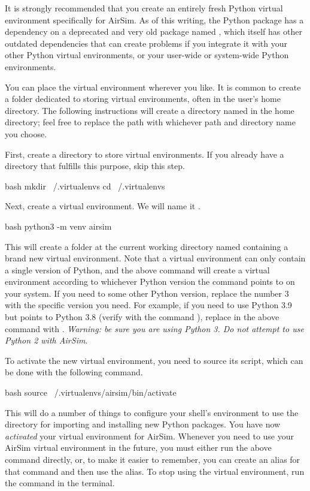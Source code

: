It is strongly recommended that you create an entirely fresh Python virtual environment specifically for AirSim. As of this writing, the  Python package has a dependency on a deprecated and very old package named , which itself has other outdated dependencies that can create problems if you integrate it with your other Python virtual environments, or your user-wide or system-wide Python environments.

You can place the virtual environment wherever you like. It is common to create a folder dedicated to storing virtual environments, often in the user's home directory. The following instructions will create a directory named  in the home directory; feel free to replace the path with whichever path and directory name you choose.

First, create a directory to store virtual environments. If you already have a directory that fulfills this purpose, skip this step.
\begin{minttcb}{bash}
    mkdir ~/.virtualenvs
    cd ~/.virtualenvs
\end{minttcb}
\noindent Next, create a virtual environment. We will name it .
\begin{minttcb}{bash}
    python3 -m venv airsim
\end{minttcb}
This will create a folder at the current working directory named  containing a brand new virtual environment. Note that a virtual environment can only contain a single version of Python, and the above command will create a virtual environment according to whichever Python version the  command points to on your system. If you need to some other Python version, replace the number 3 with the specific version you need. For example, if you need to use Python 3.9 but  points to Python 3.8 (verify with the command ), replace  in the above command with . \textit{Warning: be sure you are using Python 3. Do not attempt to use Python 2 with AirSim}.

To activate the new virtual environment, you need to source its  script, which can be done with the following command.
\begin{minttcb}{bash}
    source ~/.virtualenvs/airsim/bin/activate
\end{minttcb}
This will do a number of things to configure your shell's environment to use the  directory for importing and installing new Python packages. You have now \textit{activated} your virtual environment for AirSim. Whenever you need to use your AirSim virtual environment in the future, you must either run the above command directly, or, to make it easier to remember, you can create an alias for that command and then use the alias. To stop using the virtual environment, run the command  in the terminal.

